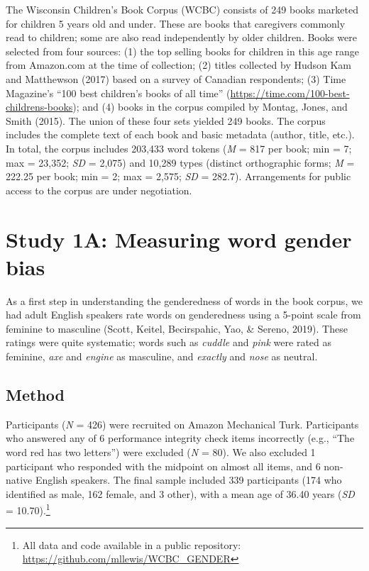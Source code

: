 \documentclass[english,,man,floatsintext]{apa6}
\let\rmarkdownfootnote\footnote%
\def\footnote{\protect\rmarkdownfootnote}
\begin{document}
The Wisconsin Children's Book Corpus (WCBC) consists of 249 books marketed for children 5 years old and under. These are books that caregivers commonly read to children; some are also read independently by older children. Books were selected from four sources: (1) the top selling books for children in this age range from Amazon.com at the time of collection; (2) titles collected by Hudson Kam and Matthewson (2017) based on a survey of Canadian respondents; (3) Time Magazine's \enquote{100 best children's books of all time} (\url{https://time.com/100-best-childrens-books}); and (4) books in the corpus compiled by Montag, Jones, and Smith (2015). The union of these four sets yielded 249 books. The corpus includes the complete text of each book and basic metadata (author, title, etc.). In total, the corpus includes 203,433 word tokens (\emph{M} = 817 per book; min = 7; max = 23,352; \emph{SD} = 2,075) and 10,289 types (distinct orthographic forms; \emph{M} = 222.25 per book; min = 2; max = 2,575; \emph{SD} = 282.7). Arrangements for public access to the corpus are under negotiation.

\hypertarget{study-1a-measuring-word-gender-bias}{%
\section{Study 1A: Measuring word gender bias}\label{study-1a-measuring-word-gender-bias}}

As a first step in understanding the genderedness of words in the book corpus, we had adult English speakers rate words on genderedness using a 5-point scale from feminine to masculine (Scott, Keitel, Becirspahic, Yao, \& Sereno, 2019). These ratings were quite systematic; words such as \emph{cuddle} and \emph{pink} were rated as feminine, \emph{axe} and \emph{engine} as masculine, and \emph{exactly} and \emph{nose} as neutral.

\hypertarget{method}{%
\subsection{Method}\label{method}}

Participants (\emph{N} = 426) were recruited on Amazon Mechanical Turk. Participants who answered any of 6 performance integrity check items incorrectly (e.g., \enquote{The word red has two letters}) were excluded (\emph{N} = 80). We also excluded 1 participant who responded with the midpoint on almost all items, and 6 non-native English speakers. The final sample included 339 participants (174 who identified as male, 162 female, and 3 other), with a mean age of 36.40 years (\emph{SD} = 10.70).\footnote{All data and code available in a public repository: \url{https://github.com/mllewis/WCBC_GENDER}}
\end{document}
